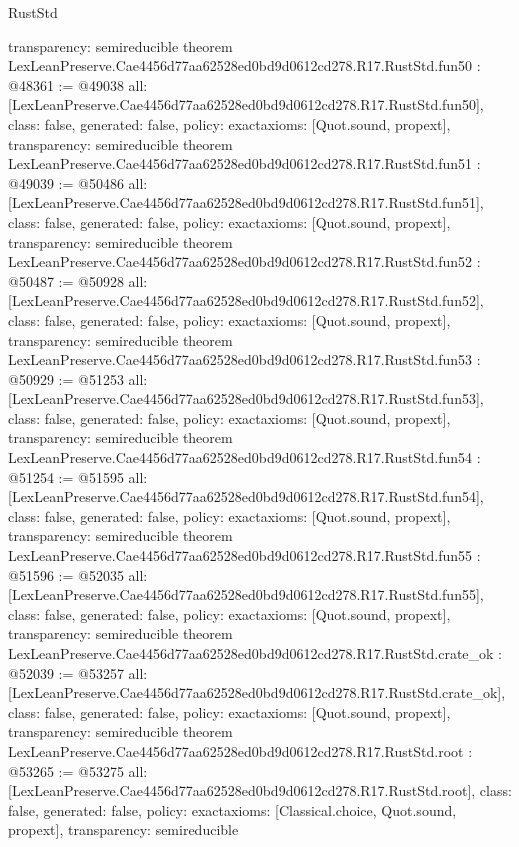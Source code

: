 \begin{lexlean}{RustStd}
\begin{coremodule}
{  transparency: semireducible
}
theorem LexLeanPreserve.Cae4456d77aa62528ed0bd9d0612cd278.R17.RustStd.fun50 : @48361 := @49038 {
  all: [LexLeanPreserve.Cae4456d77aa62528ed0bd9d0612cd278.R17.RustStd.fun50],
  class: false,
  generated: false,
  policy: exact{axioms: [Quot.sound, propext]},
  transparency: semireducible
}
theorem LexLeanPreserve.Cae4456d77aa62528ed0bd9d0612cd278.R17.RustStd.fun51 : @49039 := @50486 {
  all: [LexLeanPreserve.Cae4456d77aa62528ed0bd9d0612cd278.R17.RustStd.fun51],
  class: false,
  generated: false,
  policy: exact{axioms: [Quot.sound, propext]},
  transparency: semireducible
}
theorem LexLeanPreserve.Cae4456d77aa62528ed0bd9d0612cd278.R17.RustStd.fun52 : @50487 := @50928 {
  all: [LexLeanPreserve.Cae4456d77aa62528ed0bd9d0612cd278.R17.RustStd.fun52],
  class: false,
  generated: false,
  policy: exact{axioms: [Quot.sound, propext]},
  transparency: semireducible
}
theorem LexLeanPreserve.Cae4456d77aa62528ed0bd9d0612cd278.R17.RustStd.fun53 : @50929 := @51253 {
  all: [LexLeanPreserve.Cae4456d77aa62528ed0bd9d0612cd278.R17.RustStd.fun53],
  class: false,
  generated: false,
  policy: exact{axioms: [Quot.sound, propext]},
  transparency: semireducible
}
theorem LexLeanPreserve.Cae4456d77aa62528ed0bd9d0612cd278.R17.RustStd.fun54 : @51254 := @51595 {
  all: [LexLeanPreserve.Cae4456d77aa62528ed0bd9d0612cd278.R17.RustStd.fun54],
  class: false,
  generated: false,
  policy: exact{axioms: [Quot.sound, propext]},
  transparency: semireducible
}
theorem LexLeanPreserve.Cae4456d77aa62528ed0bd9d0612cd278.R17.RustStd.fun55 : @51596 := @52035 {
  all: [LexLeanPreserve.Cae4456d77aa62528ed0bd9d0612cd278.R17.RustStd.fun55],
  class: false,
  generated: false,
  policy: exact{axioms: [Quot.sound, propext]},
  transparency: semireducible
}
theorem LexLeanPreserve.Cae4456d77aa62528ed0bd9d0612cd278.R17.RustStd.crate_ok : @52039 := @53257 {
  all: [LexLeanPreserve.Cae4456d77aa62528ed0bd9d0612cd278.R17.RustStd.crate_ok],
  class: false,
  generated: false,
  policy: exact{axioms: [Quot.sound, propext]},
  transparency: semireducible
}
theorem LexLeanPreserve.Cae4456d77aa62528ed0bd9d0612cd278.R17.RustStd.root : @53265 := @53275 {
  all: [LexLeanPreserve.Cae4456d77aa62528ed0bd9d0612cd278.R17.RustStd.root],
  class: false,
  generated: false,
  policy: exact{axioms: [Classical.choice, Quot.sound, propext]},
  transparency: semireducible
}


\end{coremodule}
\end{lexlean}
